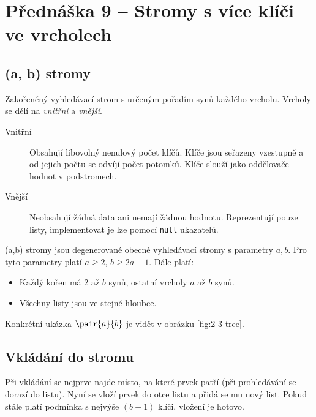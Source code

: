 \section{Přednáška 9 -- Stromy s více klíči ve vrcholech}

\subsection{(a, b) stromy}\label{data:ab-stromy}

Zakořeněný vyhledávací strom s určeným pořadím synů každého vrcholu.
Vrcholy se dělí na \textit{vnitřní} a \textit{vnější}.

\begin{description}
    \item[Vnitřní] Obsahují libovolný nenulový počet klíčů.
    Klíče jsou seřazeny vzestupně a od jejich počtu se odvíjí počet potomků.
    Klíče slouží jako oddělovače hodnot v podstromech.
    \item[Vnější] Neobsahují žádná data ani nemají žádnou hodnotu.
    Reprezentují pouze listy, implementovat je lze pomocí \texttt{null} ukazatelů.
\end{description}

(a,b) stromy jsou degenerované obecné vyhledávací stromy s parametry $a, b$.
Pro tyto parametry platí $a \geq 2$, $b \geq 2a - 1$.
Dále platí:

\begin{itemize}
    \item Každý kořen má 2 až $b$ synů, ostatní vrcholy $a$ až $b$ synů.
    \item Všechny listy jsou ve stejné hloubce.
\end{itemize}

Konkrétní ukázka $\pair{a}{b}$ je vidět v obrázku \ref{fig:2-3-tree}.



\subsection{Vkládání do stromu}

Při vkládání se nejprve najde místo, na které prvek patří (při prohledávání se dorazí do listu).
Nyní se vloží prvek do otce listu a přidá se mu nový list.
Pokud stále platí podmínka s nejvýše $(b-1)$ klíči, vložení je hotovo.

